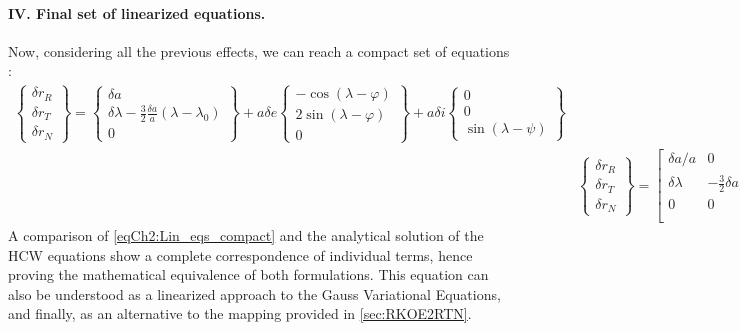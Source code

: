 			\paragraph{\textcolor{GMVred}{IV.} Final set of linearized equations. \\}
			\indent Now, considering all the previous effects, we can reach a compact set of equations \cite{Montenbruck_DAmico}:
			\begin{align}
			\label{eqCh2:Lin_eqs_full} \left\{ \begin{array}{c}
			\delta r_R\\
			\delta r_T\\
			\delta r_N
			\end{array}\right\}
			 = 
			\left\{ \begin{array}{c}
			\delta a\\
			\delta \lambda - \frac{3}{2}\frac{\delta a}{a} (\lambda - \lambda_0) \\
			0
			\end{array}\right\}
			+
			a\delta e \left\{ \begin{array}{c}
			-\cos(\lambda - \varphi)\\
			2\sin (\lambda - \varphi) \\
			0
			\end{array}\right\}
			+
			a\delta i \left\{ \begin{array}{c}
			0 \\
			0 \\
			\sin (\lambda - \psi)
			\end{array}\right\}
			\\
			&\label{eqCh2:Lin_eqs_compact} \left\{ \begin{array}{c}
			\delta r_R\\
			\delta r_T\\
			\delta r_N
			\end{array}\right\} 
			= 
			\left[\begin{array}{cccc}
			\delta a / a 	& 0 						& -\delta e_x 	& -\delta e_y \\
			\delta \lambda 	& -\frac{3}{2} \delta a / a & -2\delta e_y 	& 2\delta e_x \\
			0				& 0 						& -\delta i_y 	& \delta i_x \\
			\end{array}\right]
			\left\{ \begin{array}{c}
			1\\
			\lambda - \lambda_0\\
			\cos\lambda \\
			\sin \lambda
			\end{array}\right\} 
			\end{align}
			\indent A comparison of \ref{eqCh2:Lin_eqs_compact} and the analytical solution of the HCW equations show a complete correspondence of individual terms, hence proving the mathematical equivalence of both formulations. This equation can also be understood as a linearized approach to the Gauss Variational Equations, and finally, as an alternative to the mapping provided in \ref{sec:RKOE2RTN}.
